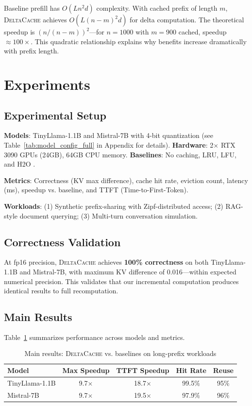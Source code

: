 \documentclass{article}
\newcommand{\deltacache}{\textsc{DeltaCache}}
\begin{document}
Baseline prefill has $O(Ln^2d)$ complexity.
With cached prefix of length $m$, \deltacache{} achieves $O(L(n{-}m)^2d)$ for delta computation.
The theoretical speedup is $(n/(n{-}m))^2$---for $n{=}1000$ with $m{=}900$ cached, speedup ${\approx}100{\times}$.
This quadratic relationship explains why benefits increase dramatically with prefix length.

\section{Experiments}

\subsection{Experimental Setup}

\textbf{Models}: TinyLlama-1.1B \citep{tinyllama} and Mistral-7B \citep{jiang2023mistral} with 4-bit quantization (see Table~\ref{tab:model_config_full} in Appendix for details).
\textbf{Hardware}: 2$\times$ RTX 3090 GPUs (24GB), 64GB CPU memory.
\textbf{Baselines}: No caching, LRU, LFU, and H2O \citep{zhang2024h2o}.

\textbf{Metrics}: Correctness (KV max difference), cache hit rate, eviction count, latency (ms), speedup vs. baseline, and TTFT (Time-to-First-Token).

\textbf{Workloads}: (1) Synthetic prefix-sharing with Zipf-distributed access; (2) RAG-style document querying; (3) Multi-turn conversation simulation.

\subsection{Correctness Validation}

At fp16 precision, \deltacache{} achieves \textbf{100\% correctness} on both TinyLlama-1.1B and Mistral-7B, with maximum KV difference of 0.016---within expected numerical precision.
This validates that our incremental computation produces identical results to full recomputation.

\subsection{Main Results}

Table~\ref{tab:main} summarizes performance across models and metrics.

\begin{table}[h]
\centering
\caption{Main results: \deltacache{} vs. baselines on long-prefix workloads}
\label{tab:main}
\begin{tabular}{lcccc}
\toprule
Model & Max Speedup & TTFT Speedup & Hit Rate & Reuse \\
\midrule
TinyLlama-1.1B & 9.7$\times$ & 18.7$\times$ & 99.5\% & 95\% \\
Mistral-7B & 9.7$\times$ & 19.5$\times$ & 97.9\% & 96\% \\
\bottomrule
\end{tabular}
\end{table}
\end{document}
